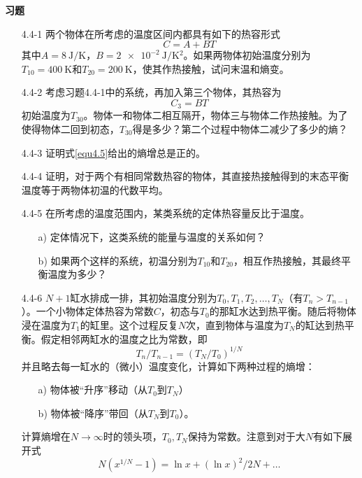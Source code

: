 {\bf 习题}
\begin{itemize}
\item[4.4-1] 两个物体在所考虑的温度区间内都具有如下的热容形式
\begin{equation*}
C=A+BT
\end{equation*}
其中$A=\SI{8}{\joule/\kelvin}$，$B=\SI{2e-2}{\joule/\kelvin^2}$。如果两物体初始温度分别为$T_{10}=\SI{400}{\kelvin}$和$T_{20}=\SI{200}{\kelvin}$，使其作热接触，试问末温和熵变。
\item[4.4-2] 考虑习题4.4-1中的系统，再加入第三个物体，其热容为
\begin{equation*}
C_3=BT
\end{equation*}
初始温度为$T_{30}$。物体一和物体二相互隔开，物体三与物体二作热接触。为了使得物体二回到初态，$T_{30}$得是多少？第二个过程中物体二减少了多少的熵？
\item[4.4-3] 证明式\eqref{equ4.5}给出的熵增总是正的。
\item[4.4-4] 证明，对于两个有相同常数热容的物体，其直接热接触得到的末态平衡温度等于两物体初温的代数平均。
\item[4.4-5] 在所考虑的温度范围内，某类系统的定体热容量反比于温度。
	\begin{itemize}
	\item[a)] 定体情况下，这类系统的能量与温度的关系如何？
	\item[b)] 如果两个这样的系统，初温分别为$T_{10}$和$T_{20}$，相互作热接触，其最终平衡温度为多少？
	\end{itemize}
\item[4.4-6] $N+1$缸水排成一排，其初始温度分别为$T_0,T_1,T_2,\dots,T_N$（有$T_n>T_{n-1}$）。一个小物体定体热容为常数$C$，初态与$T_0$的那缸水达到热平衡。随后将物体浸在温度为$T_1$的缸里。这个过程反复$N$次，直到物体与温度为$T_N$的缸达到热平衡。假定相邻两缸水的温度之比为常数，即
\begin{equation*}
T_n/T_{n-1} = (T_N/T_0)^{1/N}
\end{equation*}
并且略去每一缸水的（微小）温度变化，计算如下两种过程的熵增：
	\begin{itemize}
	\item[a)] 物体被“升序”移动（从$T_0$到$T_N$）
	\item[b)] 物体被“降序”带回（从$T_N$到$T_0$）。
	\end{itemize}
计算熵增在$N\rightarrow \infty$时的领头项，$T_0,T_N$保持为常数。注意到对于大$N$有如下展开式
\begin{equation*}
N(x^{1/N}-1)=\ln x+(\ln x)^2/2N+\dots
\end{equation*}
\end{itemize}


